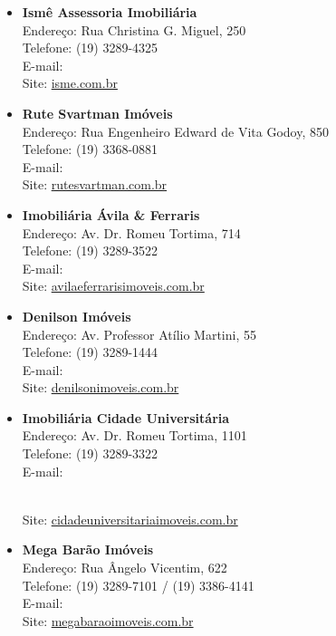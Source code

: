 \begin{itemize}
\item \textbf{Ismê Assessoria Imobiliária}
  \\Endereço: Rua Christina G. Miguel, 250
  \\Telefone: (19) 3289-4325
  \\E-mail: 
  \\Site: \url{isme.com.br}

\item \textbf{Rute Svartman Imóveis}
  \\Endereço: Rua Engenheiro Edward de Vita Godoy, 850
  \\Telefone: (19) 3368-0881
  \\E-mail: 
  \\Site: \url{rutesvartman.com.br}

\item \textbf{Imobiliária Ávila \& Ferraris}
  \\Endereço: Av. Dr. Romeu Tortima, 714
  \\Telefone: (19) 3289-3522
  \\E-mail: 
  \\Site: \url{avilaeferrarisimoveis.com.br}

\item \textbf{Denilson Imóveis}
  \\Endereço: Av. Professor Atílio Martini, 55
  \\Telefone: (19) 3289-1444
  \\E-mail: 
  \\Site: \url{denilsonimoveis.com.br}

\item \textbf{Imobiliária Cidade Universitária}
  \\Endereço: Av. Dr. Romeu Tortima, 1101
  \\Telefone: (19) 3289-3322
  \\E-mail:\\
  \begin{small}
  \end{small}
  \\Site: \url{cidadeuniversitariaimoveis.com.br}

\item \textbf{Mega Barão Imóveis}
  \\Endereço: Rua Ângelo Vicentim, 622
  \\Telefone: (19) 3289-7101 / (19) 3386-4141
  \\E-mail: 
  \\Site: \url{megabaraoimoveis.com.br}


\end{itemize}
